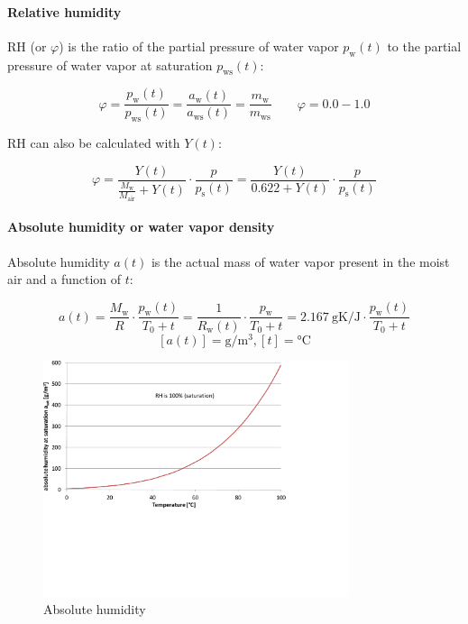 \documentclass[11pt,a4paper,english,twoside]{scrreprt}
\begin{document}
\paragraph{Relative humidity}

RH (or $\varphi$) is the ratio of the partial pressure of water vapor $p_\text{w}(t)$ to the partial pressure of water vapor at saturation $p_\text{ws}(t)$:

\[\varphi =\frac{p_\text{w}(t)}{p_\text{ws}(t)} =\frac{a_\text{w}(t)}{a_\text{ws}(t)} =\frac{m_\text{w}}{m_\text{ws}} \qquad \varphi = 0.0-1.0\]


RH can also be calculated with $Y(t)$:

\begin{equation}
  \label{eqn:RH_Y}
  \varphi =\frac{Y(t)}{\frac{M_\text{w}}{M_\text{air}} + Y(t)} \cdot \frac{p}{p_\text{s} (t)} =\frac{Y(t)}{0.622+Y(t)} \cdot \frac{p}{p_\text{s}(t)} 
\end{equation}

\paragraph{Absolute humidity or water vapor density}

Absolute humidity $a(t)$ is the actual mass of water vapor present in the moist air and a function of $t$:

\[a(t)=\frac{M_\text{w}}{R} \cdot \frac{p_\text{w}(t)}{T_0 +t} =\frac{1}{R_\text{w}(t)} \cdot \frac{p_\text{w}}{T_0 +t} = \SI{2.167}{\gram\kelvin\per\joule} \cdot \frac{p_\text{w}(t)}{T_0 +t} \]
\[[a(t)] = \si{\gram\per\cubic\meter}, [t] = \si{\degreeCelsius} \]

\begin{figure}
  \centering
  \includegraphics*[width=0.8\textwidth,angle=0]{FCF_Diag_a.pdf}
  \caption[Absolute humidity]{Absolute humidity}
\end{figure}
\end{document}

